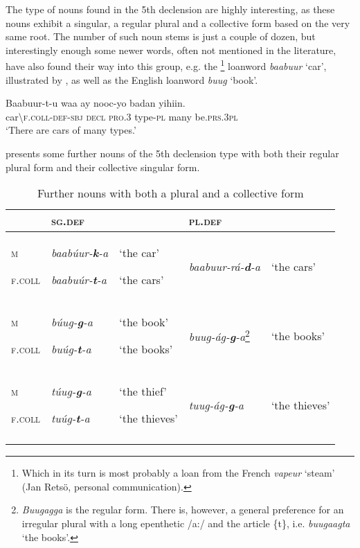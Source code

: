 \documentclass[output=paper]{langsci/langscibook}
\begin{document}
The type of nouns found in the 5th declension are highly interesting, as these nouns exhibit a singular, a regular plural and a collective form based on the very same root. The number of such noun stems is just a couple of dozen, but interestingly enough some newer words, often not mentioned in the literature, have also found their way into this group, e.g. the \footnote{Which in its turn is most probably a loan from the French \textit{vapeur} ‘steam’ (Jan Retsö, personal communication).} loanword \textit{baabuur} ‘car’, illustrated by , as well as the English loanword \textit{buug} ‘book’.

\ea\label{ex:nilsson:7}
\gll Baabuur-t-u     waa    ay    nooc-yo  badan   yihiin.\\
     car{\textbackslash}\textsc{f.coll-def-sbj}  \textsc{decl}   \textsc{pro.3}  type-\textsc{pl}  many   be.\textsc{prs.3pl}\\
\glt ‘There are cars of many types.’
\z

 presents some further nouns of the 5th declension type with both their regular plural form and their collective singular form.
 
\begin{table}[p]
\caption{Further nouns with both a plural and a collective form}
\label{tab:nilsson:10}
\begin{tabularx}{\textwidth}{XXXlX} 
\lsptoprule
& {\textsc{sg.def}} &  & {\textsc{pl.def}} & \\
\midrule
{\textsc{m}}

{\textsc{f.coll}} & {\textit{baabúur-}\textbf{\textit{k}}\textit{-a}}

{\textit{baabuúr-}\textbf{\textit{t}}\textit{-a}} & {‘the car’}

{‘the cars’} & {\textit{baabuur-rá-}\textbf{\textit{d}}\textit{-a}} & {‘the cars’}\\
\tablevspace
{\textsc{m}}

{\textsc{f.coll}} & {\textit{búug-}\textbf{\textit{g}}\textit{-a}}

{\textit{buúg-}\textbf{\textit{t}}\textit{-a}} & {‘the book’}

{‘the books’} & {\textit{buug-ág-}\textbf{\textit{g}}\textit{-a}}\footnote{\textit{Buugagga} is the regular form. There is, however, a general preference for an irregular plural with a long epenthetic /a:/ and the article \{t\}, i.e. \textit{buugaagta} ‘the books’.} & {‘the books’}\\
\tablevspace
{\textsc{m}}

{\textsc{f.coll}} & {\textit{túug-}\textbf{\textit{g}}\textit{-a}}

{\textit{tuúg-}\textbf{\textit{t}}\textit{-a}} & {‘the thief’}

{‘the thieves’} & {\textit{tuug-ág-}\textbf{\textit{g}}\textit{-a}} & {‘the thieves’}\\
\lspbottomrule
\end{tabularx}
 
\end{table} 
\end{document}
